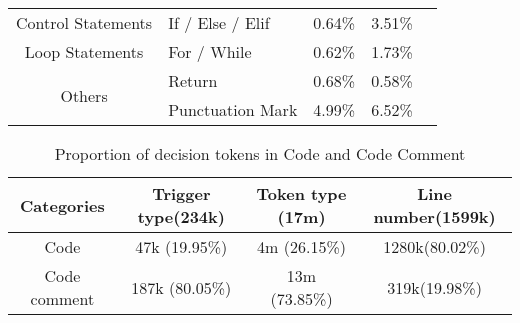 \begin{table*}[htbp]
\begin{minipage}{\textwidth}
\begin{tabular}{cl|ccc}
         \multirow{1}{*}{Control Statements} & \hspace{1.3em} If / Else / Elif &  0.64\% & 3.51\% \\
        

        \multirow{1}{*}{Loop Statements} & \hspace{1.8em} For / While &  0.62\% & 1.73\% \\
         
         \multirow{2}{*}{Others} & \vline\hspace{2.2em} Return  & 0.68\% & 0.58\% \\
        & \vline \hspace{0.2em} Punctuation Mark  & 4.99\% & 6.52\% \\
         
         \bottomrule
   \end{tabular}
   

  \label{tab:Code_confused_proportion}
    \end{minipage}
\end{table*}




\begin{table*}
 \caption{Proportion of decision tokens in Code and Code Comment}
  \centering
  \begin{tabular}{c|ccc}
    \hline
    Categories & Trigger type(234k) & Token type (17m) & Line number(1599k) \\
    \hline
    Code & 47k (19.95\%) & 4m (26.15\%) & 1280k(80.02\%)     \\
    Code comment & 187k (80.05\%) & 13m (73.85\%) & 319k(19.98\%)   \\
    \hline
  \end{tabular}
 
  \label{tab:code_and_comments}
\end{table*}

